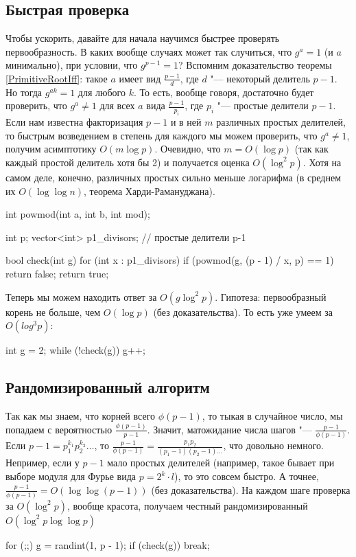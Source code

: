 \subsection{Быстрая проверка}
	Чтобы ускорить, давайте для начала научимся быстрее проверять первообразность.
	В каких вообще случаях может так случиться, что $g^a=1$ (и $a$ минимально), при условии, что $g^{p-1}=1$?
	Вспомним доказательство теоремы \ref{PrimitiveRootIff}: такое $a$ имеет вид $\frac{p-1}{d}$, где $d$ "--- некоторый делитель $p-1$.
	Но тогда $g^{ak}=1$ для любого $k$.
	То есть, вообще говоря, достаточно будет проверить, что $g^a \neq 1$ для всех $a$ вида $\frac{p - 1}{p_i}$, где $p_i$ "--- простые делители $p-1$.
	Если нам известна факторизация $p-1$ и в ней $m$ различных простых делителей, то быстрым возведением в степень для каждого мы можем проверить, что $g^a \neq 1$,
	получим асимптотику $O(m\log p)$.
	Очевидно, что $m = O(\log p)$ (так как каждый простой делитель хотя бы 2) и получается оценка $O(\log^2 p)$.
	Хотя на самом деле, конечно, различных простых сильно меньше логарифма (в среднем их $O(\log \log n)$, теорема Харди-Рамануджана).
\begin{cppcode}
int powmod(int a, int b, int mod);

int p;
vector<int> p1_divisors; // простые делители p-1

bool check(int g) {
    for (int x : p1_divisors) {
        if (powmod(g, (p - 1) / x, p) == 1) {
            return false;
        }
    }
    return true;
}
\end{cppcode}

	Теперь мы можем находить ответ за $O(g \log^2 p)$.
	Гипотеза: первообразный корень не больше, чем $O(\log p)$ (без доказательства).
	То есть уже умеем за $O(log^3 p)$:
\begin{cppcode}
int g = 2;
while (!check(g)) g++;
\end{cppcode}

\subsection{Рандомизированный алгоритм}
	Так как мы знаем, что корней всего $\phi(p-1)$, то тыкая в случайное число, мы попадаем с вероятностью $\frac{\phi(p-1)}{p-1}$.
	Значит, матожидание числа шагов "--- $\frac{p - 1}{\phi(p-1)}$.
	Если $p-1=p_1^{k_1}p_2^{k_2}\dots$, то $\frac{p-1}{\phi(p-1)} = \frac{p_1p_2}{(p_1-1)(p_2-1)\dots}$, что довольно немного.
	Непример, если у $p-1$ мало простых делителей (например, такое бывает при выборе модуля для Фурье вида $p=2^k \cdot l$), то это совсем быстро.
	А точнее, $\frac{p-1}{\phi(p-1)} = O(\log \log (p-1))$ (без доказательства).
	На каждом шаге проверка за $O(\log^2 p)$, вообще красота, получаем честный рандомизированный $O(\log^2 p \log \log p)$
\begin{cppcode}
for (;;) {
    g = randint(1, p - 1);
    if (check(g)) break;
}
\end{cppcode}

